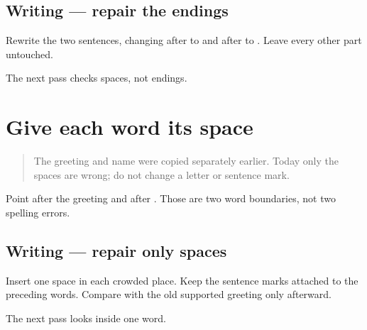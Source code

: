\subsection*{Writing — repair the endings}
Rewrite the two sentences, changing \textbf{} after \textbf{} to \textbf{} and \textbf{} after \textbf{} to \textbf{}. Leave every other part untouched.

\begin{tcolorbox}[breakable,colback=teal!4,colframe=teal!35!black,title={Before you move on}]
The next pass checks spaces, not endings.
\end{tcolorbox}
\section[\texorpdfstring{\pa{ਨਮਸਤੇ} \pa{ਮਨਨ।} · \pa{ਮੇਰਾ} \pa{ਨਾਂ} (two visible word …)}{ਨਮਸਤੇ ਮਨਨ। · ਮੇਰਾ ਨਾਂ (two visible word …)}]{Give each word its space}

\label{lesson:PA-W12-spacing-repair}



\begin{quote}
The greeting and name were copied separately earlier. Today only the spaces are wrong; do not change a letter or sentence mark.
\end{quote}

\begin{tcolorbox}[breakable,skin=enhanced,colback=orange!6,colframe=orange!45!black,boxrule=0.5pt,arc=1mm,left=6pt,right=6pt,top=4pt,bottom=4pt,fonttitle=\bfseries,title={Read this}]
\begin{quote}
   
\end{quote}

Point after the greeting and after \textbf{}. Those are two word boundaries, not two spelling errors.
\end{tcolorbox}

\subsection*{Writing — repair only spaces}
Insert one space in each crowded place. Keep the sentence marks attached to the preceding words. Compare with the old supported greeting only afterward.

\begin{tcolorbox}[breakable,colback=teal!4,colframe=teal!35!black,title={Before you move on}]
The next pass looks inside one word.
\end{tcolorbox}
